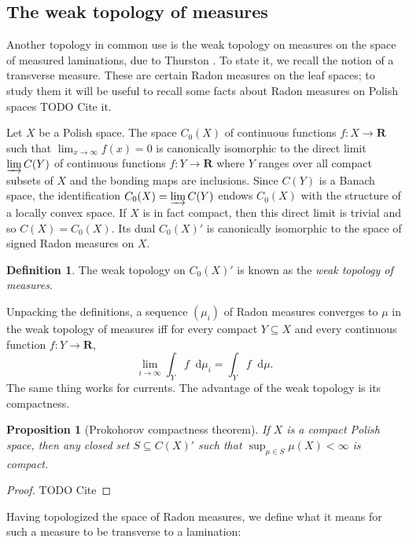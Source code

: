 \documentclass[reqno,10pt]{amsart}
\newcommand{\RR}{\mathbf{R}}
\newcommand*\dif{\mathop{}\!\mathrm{d}}
\newcommand{\dfn}[1]{\emph{#1}\index{#1}}
\newtheorem{proposition}[theorem]{Proposition}
\theoremstyle{definition}
\newtheorem{definition}[theorem]{Definition}
\numberwithin{equation}{section}
\begin{document}
\subsection{The weak topology of measures}
Another topology in common use is the weak topology on measures on the space of measured laminations, due to Thurston \cite[Chapter 8]{thurston1998minimal}.
To state it, we recall the notion of a transverse measure.
These are certain Radon measures on the leaf spaces; to study them it will be useful to recall some facts about Radon measures on Polish spaces TODO Cite it.

Let $X$ be a Polish space.
The space $C_0(X)$ of continuous functions $f: X \to \RR$ such that $\lim_{x \to \infty} f(x) = 0$ is canonically isomorphic to the direct limit $\varinjlim C(Y)$ of continuous functions $f: Y \to \RR$ where $Y$ ranges over all compact subsets of $X$ and the bonding maps are inclusions.
Since $C(Y)$ is a Banach space, the identification $C_0(X) = \varinjlim C(Y)$ endows $C_0(X)$ with the structure of a locally convex space.
If $X$ is in fact compact, then this direct limit is trivial and so $C(X) = C_0(X)$.
Its dual $C_0(X)'$ is canonically isomorphic to the space of signed Radon measures on $X$.

\begin{definition}
The weak topology on $C_0(X)'$ is known as the \dfn{weak topology of measures}.
\end{definition}

Unpacking the definitions, a sequence $(\mu_i)$ of Radon measures converges to $\mu$ in the weak topology of measures iff for every compact $Y \subseteq X$ and every continuous function $f: Y \to \RR$,
$$\lim_{i \to \infty} \int_Y f \dif \mu_i = \int_Y f \dif \mu.$$
The same thing works for currents.
The advantage of the weak topology is its compactness.

\begin{proposition}[Prokohorov compactness theorem]
If $X$ is a compact Polish space, then any closed set $S \subseteq C(X)'$ such that $\sup_{\mu \in S} \mu(X) < \infty$ is compact.
\end{proposition}
\begin{proof}
TODO Cite 
\end{proof}

Having topologized the space of Radon measures, we define what it means for such a measure to be transverse to a lamination:

\end{document}
